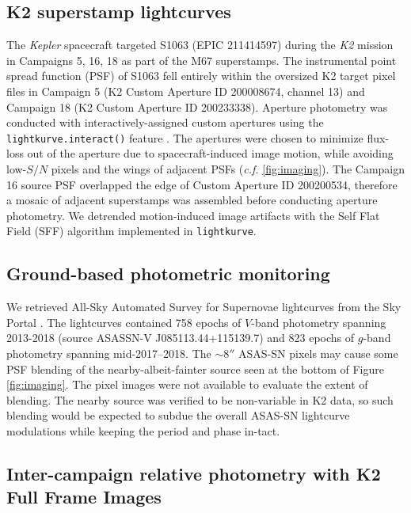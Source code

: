 \documentclass[trackchanges]{aastex631}
\begin{document}
\subsection{K2 superstamp lightcurves}
The \emph{Kepler} spacecraft targeted S1063 (EPIC 211414597) during the \emph{K2} mission \citep{howell14} in Campaigns 5, 16, 18 as part of the M67 superstamps.  The instrumental point spread function (PSF) of S1063 fell entirely within the oversized K2 target pixel files in Campaign 5 (K2 Custom Aperture ID 200008674, channel 13) and Campaign 18 (K2 Custom Aperture ID 200233338).  Aperture photometry was conducted with interactively-assigned custom apertures using the \texttt{lightkurve.interact()} feature \citep{geert_barentsen_2019_2565212}. The apertures were chosen to minimize flux-loss out of the aperture due to spacecraft-induced image motion, while avoiding low-$S/N$ pixels and the wings of adjacent PSFs (\emph{c.f.} \ref{fig:imaging}).  The Campaign 16 source PSF overlapped the edge of Custom Aperture ID 200200534, therefore a mosaic of adjacent superstamps was assembled before conducting aperture photometry.
We detrended motion-induced image artifacts with the Self Flat Field (SFF) algorithm \citep{vanderburg14} implemented in \texttt{lightkurve}.


\subsection{Ground-based photometric monitoring}
We retrieved All-Sky Automated Survey for Supernovae \citep[ASAS-SN;][]{shappee14} lightcurves from the Sky Portal \citep{2017PASP..129j4502K}.  The lightcurves contained 758 epochs of $V$-band photometry spanning 2013-2018 (source ASASSN-V J085113.44+115139.7) and 823 epochs of $g$-band photometry spanning mid-2017--2018.  The $\sim8''$ ASAS-SN pixels may cause some PSF blending of the nearby-albeit-fainter source seen at the bottom of Figure \ref{fig:imaging}.  The pixel images were not available to evaluate the extent of blending.  The nearby source was verified to be non-variable in K2 data, so such blending would be expected to subdue the overall ASAS-SN lightcurve modulations while keeping the period and phase in-tact.

\subsection{Inter-campaign relative photometry with K2 Full Frame Images}\label{sec:K2lightcurve}
\end{document}

